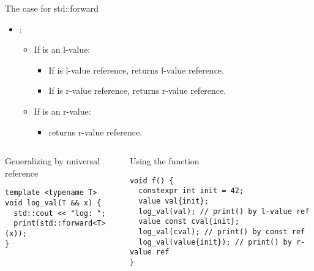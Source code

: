         
\begin{frame}[t,fragile]{The case for std::forward}
\begin{itemize}
  \item {}:
    \begin{itemize}
      \item If  is an l-value:
        \begin{itemize}
          \item If  is l-value reference,  returns l-value reference.
          \item If  is r-value reference,  returns r-value reference.
        \end{itemize}
      \item If  is an r-value:
        \begin{itemize}
          \item {} returns r-value reference.
        \end{itemize}
    \end{itemize}
\end{itemize}

\pause
\begin{columns}[T]

\begin{block}{Generalizing by universal reference}
\begin{lstlisting}
template <typename T>
void log_val(T && x) {
  std::cout << "log: ";
  print(std::forward<T>(x));
}
\end{lstlisting}
\end{block}

\begin{block}{Using the function}
\begin{lstlisting}
void f() {
  constexpr int init = 42;
  value val{init};
  log_val(val); // print() by l-value ref
  value const cval{init};
  log_val(cval); // print() by const ref
  log_val(value{init}); // print() by r-value ref
}
\end{lstlisting}
\end{block}

\end{columns}

\end{frame}
